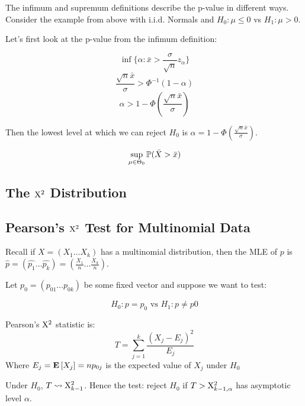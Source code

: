 \documentclass[10pt]{article}
\begin{document}
\begin{example}
    The infimum and supremum definitions describe the p-value in different
    ways. Consider the example from above with i.i.d. Normals and $H_0: \mu
    \leq 0$ vs $H_1: \mu > 0$. 

    Let's first look at the p-value from the infimum definition:

    \[\inf\{ \alpha : \bar{x} > \frac{\sigma}{\sqrt{n}}z_\alpha \} \]
    \[ \frac{\sqrt{n}\bar{x}}{\sigma} > \Phi^{-1}(1-\alpha)\]
    \[ \alpha > 1 - \Phi(\frac{\sqrt{n}\bar{x}}{\sigma}) \]

    Then the lowest level at which we can reject $H_0$ is
    $\alpha = 1- \Phi(\frac{\sqrt{n}\bar{x}}{\sigma})$.


    \[\sup_{\mu \in \Theta_0} \P(\bar{X} > \bar{x}) \]

\end{example}

\subsection{The $\Chi^2$ Distribution}

\subsection{Pearson's $\Chi^2$ Test for Multinomial Data}

Recall if $X = (X_1 \dots X_k)$ has a multinomial distribution, then the MLE of
$p$ is $\hat{p} = (\hat{p_1} \dots \hat{p_k}) = (\frac{X_1}{n} \dots
\frac{X_k}{n})$.

Let $p_0 = (p_{01} \dots p_{0k})$ be some fixed vector and suppose we want to
test:

\[H_0: p = p_0 \text{ vs } H_1: p \neq p0\]

\begin{definition}
    Pearson's $\Chi^2$ statistic is:
    \[T = \sum_{j=1}^k \frac{(X_j - E_j)^2}{E_j}\]
    Where $E_j = \E{X_j} = np_{0j}$ is the expected value of $X_j$ under $H_0$
\end{definition}

\begin{theorem}
    Under $H_0$, $T \rightsquigarrow \Chi_{k-1}^2$. Hence the test: reject
    $H_0$ if $T > \Chi^2_{k-1,\alpha}$ has asymptotic level $\alpha$.
\end{theorem}
\end{document}
